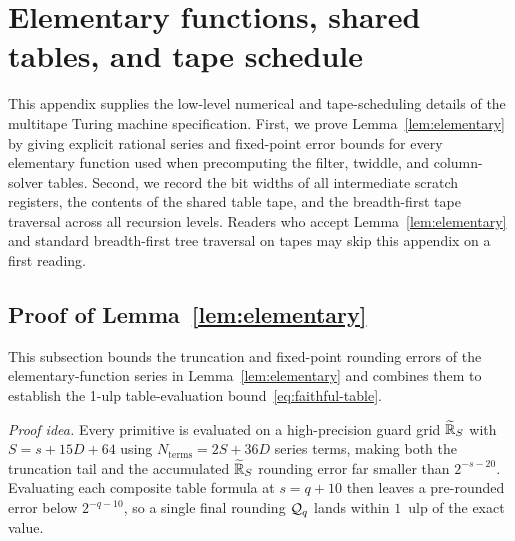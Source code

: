 \section{Elementary functions, shared tables, and tape schedule}\label{app:elementary}

This appendix supplies the low-level numerical and tape-scheduling details of the multitape Turing machine specification. First, we prove Lemma~\ref{lem:elementary} by giving explicit rational series and fixed-point error bounds for every elementary function used when precomputing the filter, twiddle, and column-solver tables. Second, we record the bit widths of all intermediate scratch registers, the contents of the shared table tape, and the breadth-first tape traversal across all recursion levels. Readers who accept Lemma~\ref{lem:elementary} and standard breadth-first tree traversal on tapes may skip this appendix on a first reading.

\subsection{Proof of Lemma~\ref{lem:elementary}}\label{app:elem-proof}

This subsection bounds the truncation and fixed-point rounding errors of the elementary-function series in Lemma~\ref{lem:elementary} and combines them to establish the 1-ulp table-evaluation bound~\eqref{eq:faithful-table}.

\medskip\noindent\emph{Proof idea.} Every primitive is evaluated on a high-precision guard grid $\widetilde{\mathbb{R}}_S$ with $S = s + 15D + 64$ using $N_{\mathrm{terms}} = 2S + 36D$ series terms, making both the truncation tail and the accumulated $\widetilde{\mathbb{R}}_S$ rounding error far smaller than $2^{-s-20}$. Evaluating each composite table formula at $s = q + 10$ then leaves a pre-rounded error below $2^{-q-10}$, so a single final rounding $\mathcal{Q}_q$ lands within $1$~ulp of the exact value.

